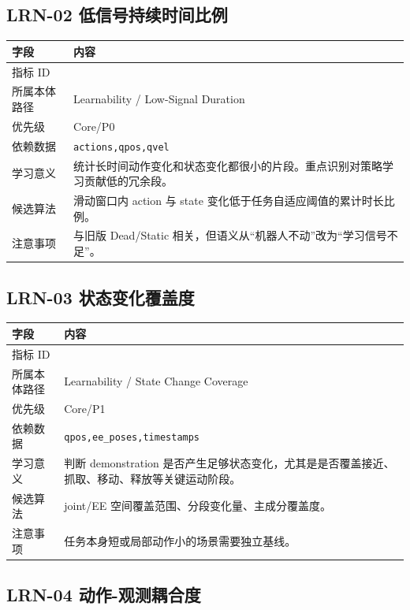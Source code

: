\documentclass[UTF8,zihao=-4,oneside,openany]{ctexrep}
\newcommand{\Code}[1]{\texttt{#1}}
\newcommand{\MID}[1]{\texttt{\seqsplit{#1}}}
\begin{document}
\subsection{LRN-02 低信号持续时间比例}

\begin{longtable}{L{3.6cm} L{9.6cm}}
\toprule
字段 & 内容 \\
\midrule
指标 ID & \MID{LRN-02} \\
所属本体路径 & Learnability / Low-Signal Duration \\
优先级 & Core/P0 \\
依赖数据 & \Code{actions,qpos,qvel} \\
学习意义 & 统计长时间动作变化和状态变化都很小的片段。重点识别对策略学习贡献低的冗余段。 \\
候选算法 & 滑动窗口内 action 与 state 变化低于任务自适应阈值的累计时长比例。 \\
注意事项 & 与旧版 Dead/Static 相关，但语义从“机器人不动”改为“学习信号不足”。 \\
\bottomrule
\end{longtable}

\subsection{LRN-03 状态变化覆盖度}

\begin{longtable}{L{3.6cm} L{9.6cm}}
\toprule
字段 & 内容 \\
\midrule
指标 ID & \MID{LRN-03} \\
所属本体路径 & Learnability / State Change Coverage \\
优先级 & Core/P1 \\
依赖数据 & \Code{qpos,ee\_poses,timestamps} \\
学习意义 & 判断 demonstration 是否产生足够状态变化，尤其是是否覆盖接近、抓取、移动、释放等关键运动阶段。 \\
候选算法 & joint/EE 空间覆盖范围、分段变化量、主成分覆盖度。 \\
注意事项 & 任务本身短或局部动作小的场景需要独立基线。 \\
\bottomrule
\end{longtable}

\subsection{LRN-04 动作-观测耦合度}
\end{document}
